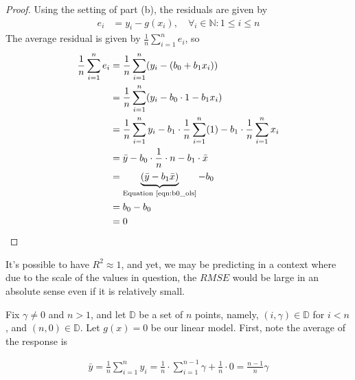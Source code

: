\documentclass[12pt]{article}
\begin{document}
\begin{enumerate}

\begin{proof}
	Using the setting of part (b), the residuals are given by
	\begin{align*}
		e_i &= y_i - g(x_i),\quad \forall_i\in\mathbb{N}: 1\leq i\leq n
	\end{align*}
	The average residual is given by $\frac{1}{n}\sum_{i=1}^{n}e_i$, so
	\begin{align*}
		\frac{1}{n}\sum_{i=1}^{n}e_i &= \frac{1}{n}\sum_{i=1}^{n}(y_i - (b_0 + b_1x_i))\\
		&=\frac{1}{n}\sum_{i=1}^{n}(y_i - b_0\cdot 1 - b_1x_i)\\
		&=\frac{1}{n}\sum_{i=1}^{n}y_i-b_1\cdot \frac{1}{n}\sum_{i=1}^{n}(1) - b_1\cdot \frac{1}{n}\sum_{i=1}^{n}x_i\\
		&=\bar{y} - b_0\cdot\frac{1}{n}\cdot n - b_1\cdot \bar{x}\\
		&=\underbrace{(\bar{y} - b_1\bar{x})}_{\text{Equation \ref{eqn:b0_ols}}} - b_0\\
		&=b_0-b_0\\
		&=0
	\end{align*}
\end{proof}


It's possible to have $R^2\approx 1$, and yet, we may be predicting in a context where
due to the scale of the values in question, the $RMSE$ would be large in an absolute sense
even if it is relatively small.



Fix $\gamma\neq 0$ and $n>1$, and let $\mathbb{D}$ be a set of $n$ points, namely,
$(i, \gamma)\in \mathbb{D}$ for $i<n$, and $(n, 0)\in \mathbb{D}$. Let $g(x)=0$
be our linear model. First, note the average of the response is

\begin{align*}
	\bar{y} = \frac{1}{n}\sum_{i=1}^{n}y_i = \frac{1}{n}\cdot \sum_{i=1}^{n-1}\gamma + \frac{1}{n}\cdot 0 = \frac{n-1}{n}\gamma
\end{align*}


\end{enumerate}
\end{document}
